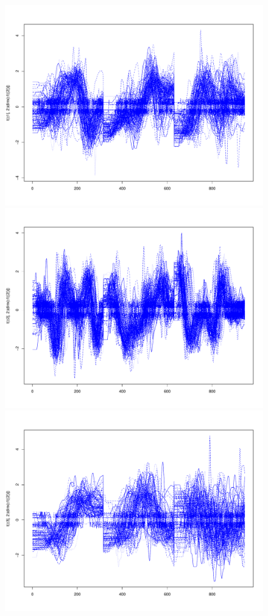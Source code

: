 \begin{figure}
\center
\includegraphics[scale=0.1]{images/c1}
\includegraphics[scale=0.1]{images/c2}
\includegraphics[scale=0.1]{images/c3}

\end{figure}
